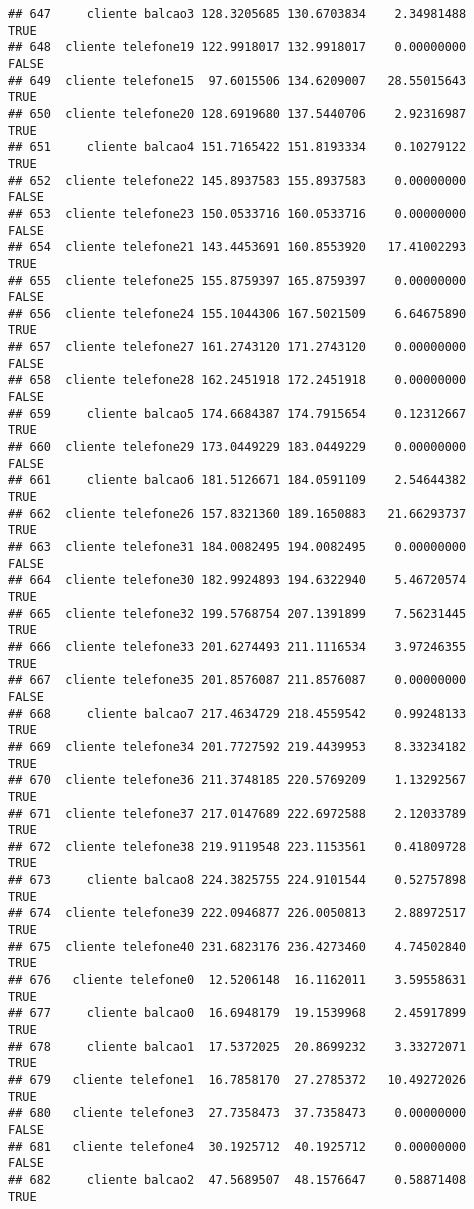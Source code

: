 \documentclass[
]{article}
\begin{document}
\begin{verbatim}
## 647     cliente balcao3 128.3205685 130.6703834    2.34981488     TRUE
## 648  cliente telefone19 122.9918017 132.9918017    0.00000000    FALSE
## 649  cliente telefone15  97.6015506 134.6209007   28.55015643     TRUE
## 650  cliente telefone20 128.6919680 137.5440706    2.92316987     TRUE
## 651     cliente balcao4 151.7165422 151.8193334    0.10279122     TRUE
## 652  cliente telefone22 145.8937583 155.8937583    0.00000000    FALSE
## 653  cliente telefone23 150.0533716 160.0533716    0.00000000    FALSE
## 654  cliente telefone21 143.4453691 160.8553920   17.41002293     TRUE
## 655  cliente telefone25 155.8759397 165.8759397    0.00000000    FALSE
## 656  cliente telefone24 155.1044306 167.5021509    6.64675890     TRUE
## 657  cliente telefone27 161.2743120 171.2743120    0.00000000    FALSE
## 658  cliente telefone28 162.2451918 172.2451918    0.00000000    FALSE
## 659     cliente balcao5 174.6684387 174.7915654    0.12312667     TRUE
## 660  cliente telefone29 173.0449229 183.0449229    0.00000000    FALSE
## 661     cliente balcao6 181.5126671 184.0591109    2.54644382     TRUE
## 662  cliente telefone26 157.8321360 189.1650883   21.66293737     TRUE
## 663  cliente telefone31 184.0082495 194.0082495    0.00000000    FALSE
## 664  cliente telefone30 182.9924893 194.6322940    5.46720574     TRUE
## 665  cliente telefone32 199.5768754 207.1391899    7.56231445     TRUE
## 666  cliente telefone33 201.6274493 211.1116534    3.97246355     TRUE
## 667  cliente telefone35 201.8576087 211.8576087    0.00000000    FALSE
## 668     cliente balcao7 217.4634729 218.4559542    0.99248133     TRUE
## 669  cliente telefone34 201.7727592 219.4439953    8.33234182     TRUE
## 670  cliente telefone36 211.3748185 220.5769209    1.13292567     TRUE
## 671  cliente telefone37 217.0147689 222.6972588    2.12033789     TRUE
## 672  cliente telefone38 219.9119548 223.1153561    0.41809728     TRUE
## 673     cliente balcao8 224.3825755 224.9101544    0.52757898     TRUE
## 674  cliente telefone39 222.0946877 226.0050813    2.88972517     TRUE
## 675  cliente telefone40 231.6823176 236.4273460    4.74502840     TRUE
## 676   cliente telefone0  12.5206148  16.1162011    3.59558631     TRUE
## 677     cliente balcao0  16.6948179  19.1539968    2.45917899     TRUE
## 678     cliente balcao1  17.5372025  20.8699232    3.33272071     TRUE
## 679   cliente telefone1  16.7858170  27.2785372   10.49272026     TRUE
## 680   cliente telefone3  27.7358473  37.7358473    0.00000000    FALSE
## 681   cliente telefone4  30.1925712  40.1925712    0.00000000    FALSE
## 682     cliente balcao2  47.5689507  48.1576647    0.58871408     TRUE

\end{verbatim}
\end{document}
